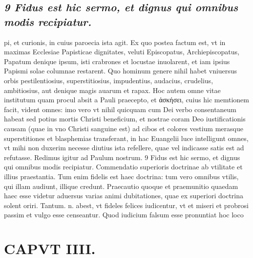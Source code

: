 \documentclass{article}
\begin{document}
\begin{pages}
\subsection*{\textit{9 Fidus est hic sermo, et dignus qui omnibus modis recipiatur.}}pi, et curionis, in cuius paroecia ista agit. Ex quo postea factum est, vt in maximas Ecclesiae Papisticae dignitates, veluti Episcopatus, Archiepiscopatus, Papatum denique ipsum, isti crabrones et locustae inuolarent, et iam ipsius Papismi solae columnae restarent. Quo hominum genere nihil habet vniuersus orbis pestilentiosius, superstitiosius, impudentius, audacius, crudelius, ambitiosius, aut denique magis auarum et rapax. Hoc autem omne vitae institutum quam procul absit a Pauli praecepto, et ἀσκήσει, cuius hic memtionem facit, vident omnes: imo vero vt nihil quicquam cum Dei verbo consentaneum habeat sed potius mortis Christi beneficium, et nostrae coram Deo iustificationis causam (quae in vno Christi sanguine est) ad cibos et colores vestium merasque superstitiones et blasphemias transferant, in hac Euangelii luce intelligunt omnes, vt mihi non duxerim necesse diutius ista refellere, quae vel indicasse satis est ad refutasse. Redimus igitur ad Paulum nostrum. 9 Fidus est hic sermo, et dignus qui omnibus modis recipiatur. Commendatio superioris doctrinae ab vtilitate et illius praestantia. Tum enim fidelis est haec doctrina: tum vero omnibus vtilis, qui illam audiunt, illique credunt. Praecautio quoque et praemunitio quaedam haec esse videtur aduersus varias animi dubitationes, quae ex superiori doctrina solent oriri. Tantum. n. abest, vt fideles felices iudicentur, vt et miseri et probrosi passim et vulgo esse censeantur. Quod iudicium falsum esse pronuntiat hoc loco  \pend
\section*{CAPVT  IIII. }
\marginpar{[ p.228 ]}\pstart {}
{}

\end{pages}
\end{document}
